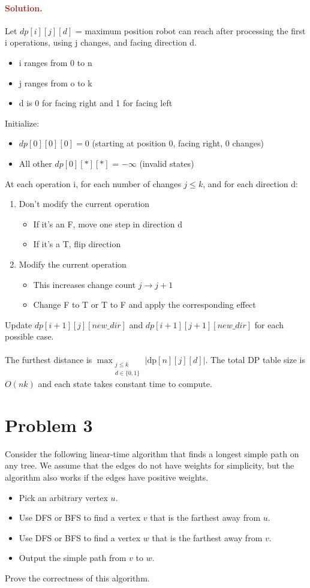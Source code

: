 \paragraph{\textcolor{brown}{Solution.}}
Let $dp[i][j][d]$ = maximum position robot can reach after processing the first i operations, using j changes, and facing direction d. \begin{itemize} \item i ranges from 0 to n \item j ranges from o to k \item d is 0 for facing right and 1 for facing left \end{itemize}
Initialize: \begin{itemize} \item $dp[0][0][0] = 0$ (starting at position 0, facing right, 0 changes) \item All other $dp[0][*][*]$ = $-\infty$ (invalid states) \end{itemize}
At each operation i, for each number of changes $j \leq k$, and for each direction d: \begin{enumerate} \item Don't modify the current operation \begin{itemize} \item If it's an F, move one step in direction d \item If it's a T, flip direction \end{itemize} \item Modify the current operation \begin{itemize} \item This increases change count $j \rightarrow j+1$ \item Change F to T or T to F and apply the corresponding effect \end{itemize} \end{enumerate} Update $dp[i+1][j][new\_dir]$ and $dp[i+1][j+1][new\_dir]$ for each possible case.
\\ \\ The furthest distance is $\max_{\substack{j \leq k \\ d \in \{0, 1\}}} \left| \mathrm{dp}[n][j][d] \right|$. The total DP table size is $O(nk)$ and each state takes constant time to compute.


\section*{Problem 3}
Consider the following linear-time algorithm that finds a longest simple path on any tree. We assume that the edges do not have weights for simplicity, but the algorithm also works if the edges have positive weights.
\begin{itemize}
    \item Pick an arbitrary vertex $u$.
    \item Use DFS or BFS to find a vertex $v$ that is the farthest away from $u$.
    \item Use DFS or BFS to find a vertex $w$ that is the farthest away from $v$.
    \item Output the simple path from $v$ to $w$.
\end{itemize}
Prove the correctness of this algorithm.

